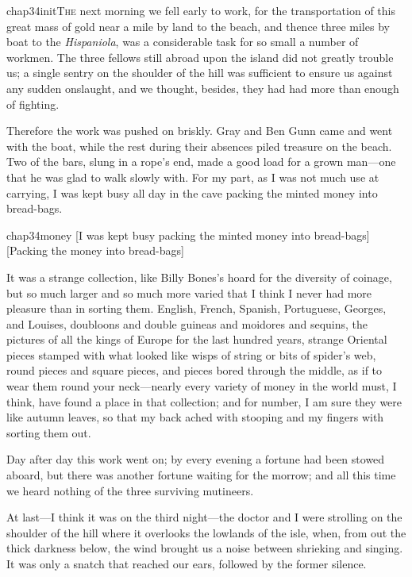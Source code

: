
\lettrine{chap34initT}{he} next morning we fell early to work, for the transportation of this great mass of gold near a mile by land to the beach, and thence three miles by boat to the \textit{Hispaniola}, was a considerable task for so small a number of workmen. The three fellows still abroad upon the island did not greatly trouble us; a single sentry on the shoulder of the hill was sufficient to ensure us against any sudden onslaught, and we thought, besides, they had had more than enough of fighting.

Therefore the work was pushed on briskly. Gray and Ben Gunn came and went with the boat, while the rest during their absences piled treasure on the beach. Two of the bars, slung in a rope's end, made a good load for a grown man—one that he was glad to walk slowly with. For my part, as I was not much use at carrying, I was kept busy all day in the cave packing the minted money into bread-bags.

\begin{bwbigpic}
	[\basicscale]
	{chap34money}
	[I was kept busy packing the minted money into bread-bags]
	[Packing the money into bread-bags]
\end{bwbigpic}

It was a strange collection, like Billy Bones's hoard for the diversity of coinage, but so much larger and so much more varied that I think I never had more pleasure than in sorting them. English, French, Spanish, Portuguese, Georges, and Louises, doubloons and double guineas and moidores and sequins, the pictures of all the kings of Europe for the last hundred years, strange Oriental pieces stamped with what looked like wisps of string or bits of spider's web, round pieces and square pieces, and pieces bored through the middle, as if to wear them round your neck—nearly every variety of money in the world must, I think, have found a place in that collection; and for number, I am sure they were like autumn leaves, so that my back ached with stooping and my fingers with sorting them out.

Day after day this work went on; by every evening a fortune had been stowed aboard, but there was another fortune waiting for the morrow; and all this time we heard nothing of the three surviving mutineers.

At last—I think it was on the third night—the doctor and I were strolling on the shoulder of the hill where it overlooks the lowlands of the isle, when, from out the thick darkness below, the wind brought us a noise between shrieking and singing. It was only a snatch that reached our ears, followed by the former silence.

